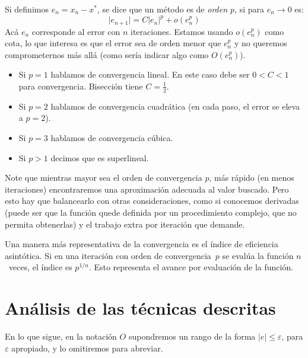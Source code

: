   Si definimos \(e_n = x_n - x^*\),
  se dice que un método es de \emph{orden \(p\)},
  si para \(e_n \to 0\) es:
  \begin{equation}
    \lvert e_{n+1} \rvert
      = C \lvert e_n \rvert^p + o(e_n^p)
  \end{equation}
  Acá \(e_n\) corresponde al error con \(n\) iteraciones.
  Estamos usando \(o(e_n^p)\) como cota,
  lo que interesa es que el error sea de orden menor que \(e_n^p\)
  y no queremos comprometernos más allá
  (como sería indicar algo como \(O(e_n^p)\)).
  \begin{itemize}
  \item
    Si \(p = 1\) hablamos de convergencia lineal.
    En este caso debe ser \(0 < C < 1\) para convergencia.
    Bisección tiene \(C = \frac{1}{2}\).
  \item
    Si \(p = 2\) hablamos de convergencia cuadrática
    (en cada paso, el error se eleva a \(p = 2\)).
  \item
    Si \(p = 3\) hablamos de convergencia cúbica.
  \item
    Si	\(p > 1\) decimos que es superlineal.
  \end{itemize}
  Note que mientras mayor sea el orden de convergencia \(p\),
  más rápido
  (en menos iteraciones)
  encontraremos una aproximación adecuada al valor buscado.
  Pero esto hay que balancearlo con otras consideraciones,
  como si conocemos derivadas
  (puede ser que la función quede definida por un procedimiento complejo,
   que no permita obtenerlas)
  y el trabajo extra por iteración que demande.

  Una manera más representativa de la convergencia
  es el índice de eficiencia asintótica.
  Si en una iteración con orden de convergencia~\(p\)
  se evalúa la función \(n\)~veces,
  el índice es \(p^{1/n}\).
  Esto representa el avance por evaluación de la función.

\section{Análisis de las técnicas descritas}
\label{sec:analisis-tecnicas}

  En lo que sigue,
  en la notación \(O\)
  supondremos un rango de la forma \(\lvert e \rvert \le \varepsilon\),
  para \(\varepsilon\) apropiado,
  y lo omitiremos para abreviar.

